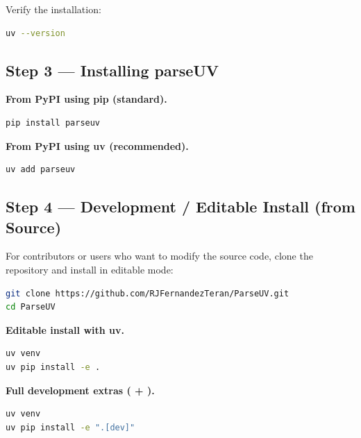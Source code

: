\documentclass[11pt,a4paper]{article}
\newcommand{\code}[1]{\texttt{\detokenize{#1}}}
\begin{document}
Verify the installation:
\begin{lstlisting}[language=bash, style=py]
uv --version
\end{lstlisting}

\subsection{Step 3 — Installing parseUV}

\noindent\textbf{From PyPI using pip (standard).}\par\nopagebreak\vspace{0.3em}
\begin{lstlisting}[language=bash, style=py]
pip install parseuv
\end{lstlisting}

\noindent\textbf{From PyPI using uv (recommended).}\par\nopagebreak\vspace{0.3em}
\begin{lstlisting}[language=bash, style=py]
uv add parseuv
\end{lstlisting}

\subsection{Step 4 — Development / Editable Install (from Source)}

For contributors or users who want to modify the source code, clone the repository and install in editable mode:

\begin{lstlisting}[language=bash, style=py]
git clone https://github.com/RJFernandezTeran/ParseUV.git
cd ParseUV
\end{lstlisting}

\noindent\textbf{Editable install with uv.}\par\nopagebreak\vspace{0.3em}
\begin{lstlisting}[language=bash, style=py]
uv venv
uv pip install -e .
\end{lstlisting}

\noindent\textbf{Full development extras (\code{ruff} + \code{pytest}).}\par\nopagebreak\vspace{0.3em}
\begin{lstlisting}[language=bash, style=py]
uv venv
uv pip install -e ".[dev]"
\end{lstlisting}
\end{document}
